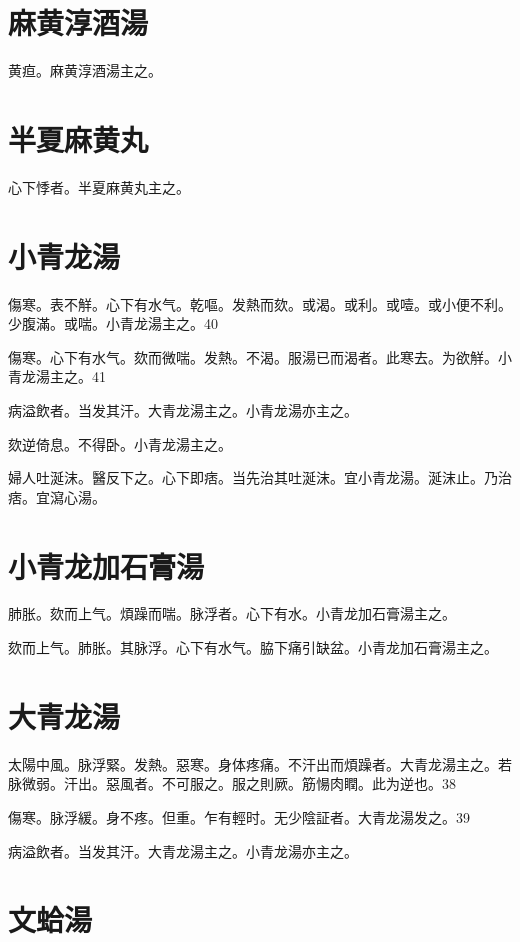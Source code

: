 \documentclass[12pt,twoside,UTF8,b5paper]{ctexbook}
\begin{document}
\section{麻黄淳酒湯}

黄疸。麻黄淳酒湯主之。

\section{半夏麻黄丸}

心下悸者。半夏麻黄丸主之。

\section{小青龙湯}

傷寒。表不觧。心下有水气。乾嘔。发熱而欬。或渴。或利。或噎。或小便不利。少腹滿。或喘。小青龙湯主之。40

傷寒。心下有水气。欬而微喘。发熱。不渴。服湯已而渴者。此寒去。为欲觧。小青龙湯主之。41

病溢飲者。当发其汗。大青龙湯主之。小青龙湯亦主之。

欬逆倚息。{不得卧。}小青龙湯主之。

婦人吐涎沫。醫反下之。心下即痞。当先治其吐涎沫。宜小青龙湯。涎沫止。乃治痞。宜瀉心湯。

\section{小青龙加石膏湯}

肺胀。欬而上气。煩躁而喘。脉浮者。心下有水。小青龙加石膏湯主之。

欬而上气。肺胀。其脉浮。心下有水气。脇下痛引缺盆。小青龙加石膏湯主之。

\section{大青龙湯}

太陽中風。脉浮緊。发熱。惡寒。身{体}疼痛。不汗出而煩躁者。大青龙湯主之。若脉微弱。汗出。惡風者。不可服之。服之則厥。筋愓肉瞤。此为逆也。38

傷寒。脉浮緩。身不疼。但重。乍有輕时。无少陰証者。大青龙湯发之。39

病溢飲者。当发其汗。大青龙湯主之。小青龙湯亦主之。

\section{文蛤湯}
\end{document}
